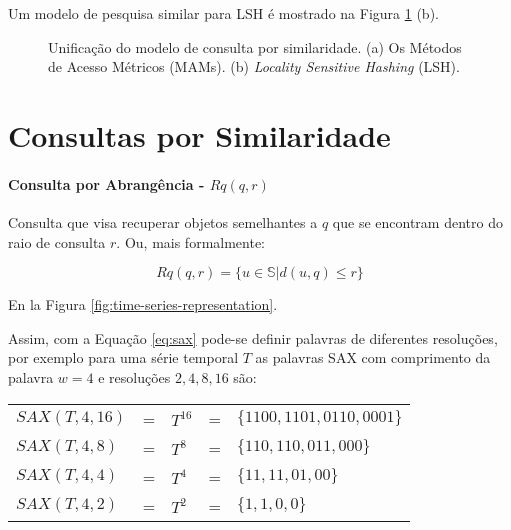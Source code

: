 
Um modelo de pesquisa similar para LSH é mostrado na Figura \ref{fig:search_model} (b).

\begin{figure}[htp]
\centering
{}
\caption{Unificação do modelo de consulta por similaridade. (a) Os Métodos de Acesso Métricos (MAMs). (b)  \textit{Locality Sensitive Hashing} (LSH).}
\label{fig:search_model}
\end{figure}

\section{Consultas por Similaridade}\label{sec:consultas-similaridade}

\paragraph{Consulta por Abrangência - $Rq(q, r)$}
Consulta que visa recuperar objetos semelhantes a $q$ que se encontram dentro do raio de consulta $r$.  Ou, mais formalmente:

\begin{equation}
    Rq(q, r) = \{ u \in \mathbb{S} | d(u, q) \leq r \}
\end{equation}


En la Figura \ref{fig:time-series-representation}.

\noindent Assim, com a Equação \ref{eq:sax} pode-se definir palavras de diferentes resoluções, por exemplo para uma série temporal $T$ as palavras SAX com comprimento da palavra $w=4$ e resoluções $2,4,8,16$ são:
\begin{table}[h]
	\begin{tabular}{lclcl}
		$SAX(T, 4, 16)$ & = &$T^{16}$ & =& $\{1100, 1101, 0110, 0001\}$\\
		$SAX(T, 4, 8)$ & = &$T^8$ & = & $\{110, 110, 011, 000\}$\\
		$SAX(T, 4, 4)$ & = &$T^4$ & = & $\{11, 11, 01, 00\}$\\
		$SAX(T, 4, 2)$ & = &$T^2$ & = & $\{1, 1, 0, 0\}$\\
	\end{tabular}
\end{table}



